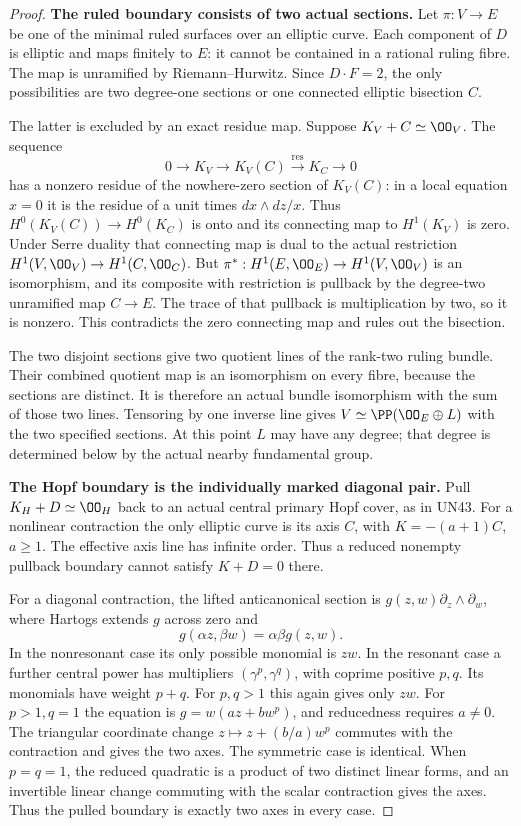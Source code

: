 \begin{proof}
\par\medskip\noindent\textbf{The ruled boundary consists of two actual sections.}
Let $\pi:V\to E$ be one of the minimal ruled
surfaces over an elliptic curve. Each component
of $D$ is elliptic and maps finitely to $E$:
it cannot be contained in a rational ruling
fibre. The map is unramified by
Riemann--Hurwitz. Since $D\cdot F=2$, the
only possibilities are two degree-one
sections or one connected elliptic
bisection $C$.

The latter is excluded by an exact residue
map. Suppose $K_V+C\simeq\OO_V$.
The sequence
\[
 0\longrightarrow K_V\longrightarrow K_V(C)
      \xrightarrow{\operatorname{res}}K_C\longrightarrow0
\tag{C.CZ.10}
\]
has a nonzero residue of the nowhere-zero
section of $K_V(C)$: in a local equation
$x=0$ it is the residue of a unit times
$dx\wedge dz/x$. Thus
$H^0(K_V(C))\to H^0(K_C)$ is onto and
its connecting map to $H^1(K_V)$ is zero.
Under Serre duality that connecting map
is dual to the actual restriction
$H^1(V,\OO_V)\to H^1(C,\OO_C)$.
But $\pi^*:H^1(E,\OO_E)\to H^1(V,\OO_V)$
is an isomorphism, and its composite with
restriction is pullback by the degree-two
unramified map $C\to E$. The trace of
that pullback is multiplication by two,
so it is nonzero. This contradicts the
zero connecting map and rules out the
bisection.

The two disjoint sections give two
quotient lines of the rank-two ruling
bundle. Their combined quotient map is
an isomorphism on every fibre, because
the sections are distinct. It is therefore
an actual bundle isomorphism with the
sum of those two lines. Tensoring by
one inverse line gives
$V\simeq\PP(\OO_E\oplus L)$ with the
two specified sections. At this point
$L$ may have any degree; that degree
is determined below by the actual
nearby fundamental group.

\par\medskip\noindent\textbf{The Hopf boundary is the individually marked diagonal pair.}
Pull $K_H+D\simeq\OO_H$ back to an actual
central primary Hopf cover, as in UN43.
For a nonlinear contraction the only
elliptic curve is its axis $C$, with
$K=-(a+1)C$, $a\ge1$. The effective
axis line has infinite order. Thus a
reduced nonempty pullback boundary
cannot satisfy $K+D=0$ there.

For a diagonal contraction, the lifted
anticanonical section is
$g(z,w)\partial_z\wedge\partial_w$,
where Hartogs extends $g$ across zero
and
\[
                        g(\alpha z,\beta w)
                                      =\alpha\beta g(z,w).
\tag{C.CZ.11}
\]
In the nonresonant case its only
possible monomial is $zw$.
In the resonant case a further central
power has multipliers $(\gamma^p,\gamma^q)$,
with coprime positive $p,q$.
Its monomials have weight $p+q$.
For $p,q>1$ this again gives only
$zw$. For $p>1,q=1$ the equation is
$g=w(az+bw^p)$, and reducedness
requires $a\ne0$. The triangular
coordinate change $z\mapsto z+(b/a)w^p$
commutes with the contraction and
gives the two axes. The symmetric
case is identical. When $p=q=1$,
the reduced quadratic is a product
of two distinct linear forms, and
an invertible linear change commuting
with the scalar contraction gives
the axes. Thus the pulled boundary
is exactly two axes in every case.


\end{proof}
